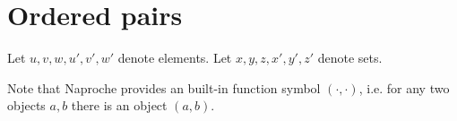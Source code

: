 \documentclass[../../set-theory.ftl.tex]{subfiles}
\begin{document}
  \begin{comment}
    \begin{forthel}

    \end{forthel}
  \end{comment}


  \section{Ordered pairs}

  \begin{forthel}
  \end{forthel}

  \begin{forthel}
    Let $u,v,w,u',v',w'$ denote elements.
    Let $x,y,z,x',y',z'$ denote sets.
  \end{forthel}

  Note that Naproche provides an built-in function symbol $(\cdot,\cdot)$, i.e. for any two objects $a,b$ there is an object $(a,b)$.
\end{document}
